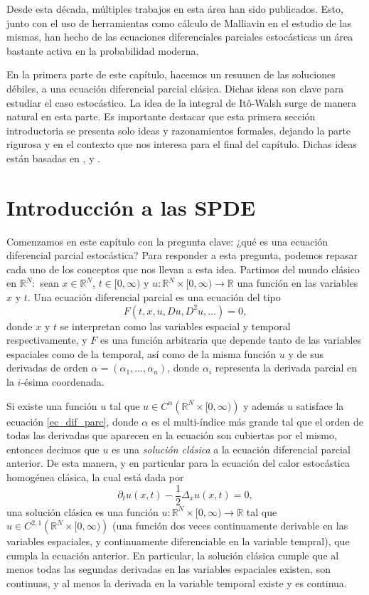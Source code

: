 \documentclass[letterpaper,twoside,12pt]{book}
\newcommand{\R}{\mathbb{R}}
\newcommand{\1}{\mathds{1}}
\renewcommand{\to}{\rightarrow}
\theoremstyle{definition}
\theoremstyle{definition}
\theoremstyle{remark}
\theoremstyle{definition}
\theoremstyle{definition}
\theoremstyle{definition}
\theoremstyle{definition}
\theoremstyle{definition}
\begin{document}
Desde esta década, múltiples trabajos en esta área han sido publicados. Esto, junto con el uso de herramientas como cálculo de Malliavin en el estudio de las mismas, han hecho de las ecuaciones diferenciales parciales estocásticas un área bastante activa en la probabilidad moderna.

En la primera parte de este capítulo, hacemos un resumen de las soluciones débiles, a una ecuación diferencial parcial clásica. Dichas ideas son clave para estudiar el caso estocástico. La idea de la integral de Itô-Walsh surge de manera natural en esta parte. Es importante destacar que esta primera sección introductoria se presenta solo ideas y razonamientos formales, dejando la parte rigurosa y en el contexto que nos interesa para el final del capítulo. Dichas ideas están basadas en \cite{evans2010partial}, \cite{BonderEcuaciones} y \cite{Khoshnevisan2009}.

\section{Introducción a las SPDE}

Comenzamos en este capítulo con la pregunta clave: ¿qué es una ecuación diferencial parcial estocástica? Para responder a esta pregunta, podemos repasar cada uno de los conceptos que nos llevan a esta idea. Partimos del mundo clásico en $\R^{N}:$ sean $x\in \R^{N}$, $t\in [0,\infty)$ y $u:\R^{N}\times[0,\infty)\to \R$ una función en las variables $x$ y $t$. Una ecuación diferencial parcial es una ecuación del tipo 
\begin{equation}\label{ec_dif_parc}
    F(t,x,u,Du,D^2u,...)=0,    
\end{equation}
donde $x$ y $t$ se interpretan como las variables espacial y temporal respectivamente, y $F$ es una función arbitraria que depende tanto de las variables espaciales como de la temporal, así como de la misma función $u$ y de sus derivadas de orden $\alpha=(\alpha_1,...,\alpha_n)$, donde $\alpha_i$ representa la derivada parcial en la $i$-ésima coordenada.

Si existe una función $u$ tal que $u\in C^{\alpha}\left(\R^{N}\times [0,\infty)\right)$ y además $u$ satisface la ecuación \eqref{ec_dif_parc}, donde $\alpha$ es el multi-índice más grande tal que el orden de todas las derivadas que aparecen en la ecuación son cubiertas por el mismo, entonces decimos que $u$ es una \textit{solución clásica} a la ecuación diferencial parcial anterior. De esta manera, y en particular para la ecuación del calor estocástica homogénea clásica, la cual está dada por 
   \begin{equation*}
      \partial_tu(x,t)-\frac{1}{2}\Delta_x u(x,t)=0,
   \end{equation*}
una solución clásica es una función $u:\R^{N}\times[0,\infty)\to \R$ tal que $u\in C^{2,1}\left(\R^{N}\times [0,\infty)\right)$ (una función dos veces continuamente derivable en las variables espaciales, y continuamente diferenciable en la variable tempral), que cumpla la ecuación anterior. En particular, la solución clásica cumple que al menos todas las segundas derivadas en las variables espaciales existen, son continuas, y al menos la derivada en la variable temporal existe y es continua.
\end{document}
